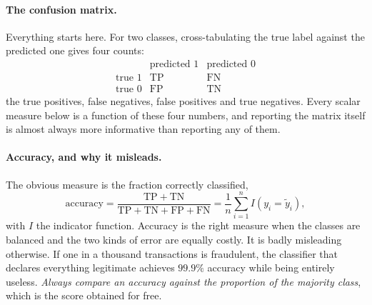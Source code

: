 \paragraph{The confusion matrix.}
Everything starts here.  For two classes, cross-tabulating the true label
against the predicted one gives four counts:
\begin{equation}
  \begin{array}{c|cc}
     & \text{predicted } 1 & \text{predicted } 0\\
    \hline
    \text{true } 1 & \mathrm{TP} & \mathrm{FN}\\
    \text{true } 0 & \mathrm{FP} & \mathrm{TN}
  \end{array}
  \label{eq:5-confusion}
\end{equation}
the true positives, false negatives, false positives and true negatives.
Every scalar measure below is a function of these four numbers, and reporting
the matrix itself is almost always more informative than reporting any of
them.

\paragraph{Accuracy, and why it misleads.}
The obvious measure is the fraction correctly classified,
\begin{equation}
  \mathrm{accuracy} = \frac{\mathrm{TP}+\mathrm{TN}}
    {\mathrm{TP}+\mathrm{TN}+\mathrm{FP}+\mathrm{FN}}
   = \frac{1}{n}\sum_{i=1}^{n} I\!\left(y_i=\tilde{y}_i\right),
  \label{eq:5-accuracy}
\end{equation}
with $I$ the indicator function.  Accuracy is the right measure when the
classes are balanced and the two kinds of error are equally costly.  It is
badly misleading otherwise.  If one in a thousand transactions is fraudulent,
the classifier that declares everything legitimate achieves $99.9\%$ accuracy
while being entirely useless.  \emph{Always compare an accuracy against the
proportion of the majority class}, which is the score obtained for free.

